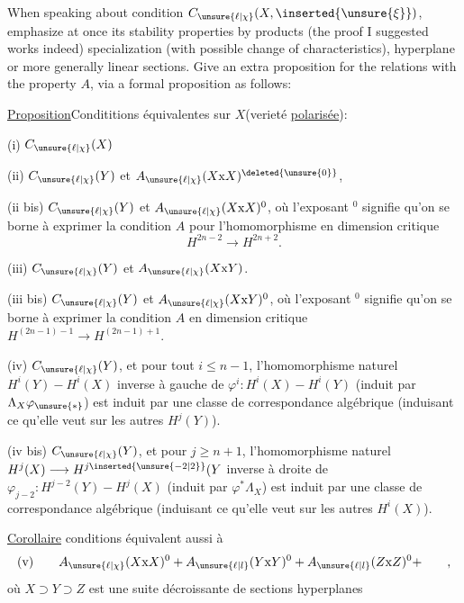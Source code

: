 When speaking about condition $C_{\unsure{\ell|\chi}}(X,\inserted{\unsure{\xi}})$, emphasize at once its stability properties by products (the proof I suggested works indeed) specialization (with possible change of characteristics), hyperplane or more generally linear sections. Give an extra proposition for the relations with the property $A$, via a formal proposition as follows:

\uline{Proposition}\quad Condititions équivalentes sur $X$(verieté \uline{polarisée}):

(i) $C_{\unsure{\ell|\chi}}(X)$

(ii) $C_{\unsure{\ell|\chi}}(Y)$ et $A_{\unsure{\ell|\chi}}(X\mathrm{x}X)^{\deleted{\unsure{0}}}$, 

(ii bis) $C_{\unsure{\ell|\chi}}(Y)$ et $A_{\unsure{\ell|\chi}}(X\mathrm{x}X)^0$, où l'exposant $^0$ signifie qu'on se borne à exprimer la condition $A$ pour l'homomorphisme en dimension critique
\[
H^{2n-2}\longrightarrow H^{2n+2}.
\]

(iii) $C_{\unsure{\ell|\chi}}(Y)$ et $A_{\unsure{\ell|\chi}}(X\mathrm{x}Y)$.

(iii bis) $C_{\unsure{\ell|\chi}}(Y)$ et $A_{\unsure{\ell|\chi}}(X\mathrm{x}Y)^0$, où l'exposant $^0$ signifie qu'on se borne à exprimer la condition $A$ en dimension critique $H^{(2n-1)-1}\longrightarrow H^{(2n-1)+1}$.

(iv)  $C_{\unsure{\ell|\chi}}(Y)$, et pour tout $i\leq n-1$, l'homomorphisme naturel $H^i(Y)\mathbin{-}H^i(X)$ inverse à gauche de $\varphi^i:H^i(X)\mathbin{-}H^i(Y)$ (induit par $\Lambda_X\varphi_{\unsure{*}}$) est induit par une classe de correspondance algébrique (induisant ce qu'elle veut sur les autres $H^j(Y)$).

(iv bis) $C_{\unsure{\ell|\chi}}(Y)$, et pour $j\geq n+1$, l'homomorphisme naturel $H^j(X)\longrightarrow H^{j\inserted{\unsure{-2|2}}}(Y$ inverse à droite de $\varphi_{j-2}:H^{j-2}(Y)\mathbin{-}H^j(X)$  (induit par $\varphi^*\Lambda_X$) est induit par une classe de correspondance algébrique (induisant ce qu'elle veut sur les autres $H^i(X)$).

\uline{Corollaire}\quad {} conditions équivalent aussi à
\[
\text{(v)}\qquad A_{\unsure{\ell|\chi}}(X\mathrm{x}X)^0+A_{\unsure{\ell|l}}(Y\mathrm{x}Y)^0+A_{\unsure{\ell|l}}(Z\mathrm{x}Z)^0+\qquad,
\]
où $X\supset Y\supset Z$ est une suite décroissante de sections hyperplanes

